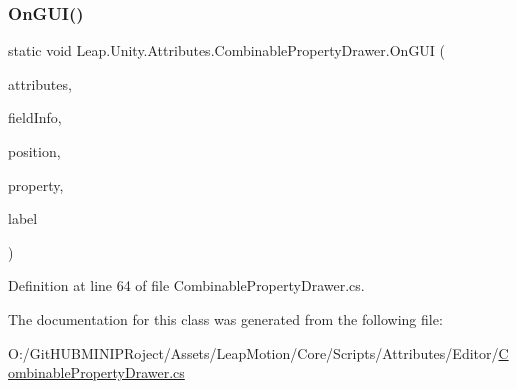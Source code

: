 \subsubsection{\texorpdfstring{OnGUI()}{OnGUI()}\hspace{0.1cm}{\footnotesize\ttfamily [2/2]}}
{\footnotesize\ttfamily static void Leap.\+Unity.\+Attributes.\+Combinable\+Property\+Drawer.\+On\+G\+UI (\begin{DoxyParamCaption}\item[{List$<$ \mbox{\hyperlink{class_leap_1_1_unity_1_1_attributes_1_1_combinable_property_attribute}{Combinable\+Property\+Attribute}} $>$}]{attributes,  }\item[{Field\+Info}]{field\+Info,  }\item[{Rect}]{position,  }\item[{Serialized\+Property}]{property,  }\item[{G\+U\+I\+Content}]{label }\end{DoxyParamCaption})\hspace{0.3cm}{\ttfamily [static]}}



Definition at line 64 of file Combinable\+Property\+Drawer.\+cs.



The documentation for this class was generated from the following file\+:\begin{DoxyCompactItemize}
\item 
O\+:/\+Git\+H\+U\+B\+M\+I\+N\+I\+P\+Roject/\+Assets/\+Leap\+Motion/\+Core/\+Scripts/\+Attributes/\+Editor/\mbox{\hyperlink{_combinable_property_drawer_8cs}{Combinable\+Property\+Drawer.\+cs}}\end{DoxyCompactItemize}
